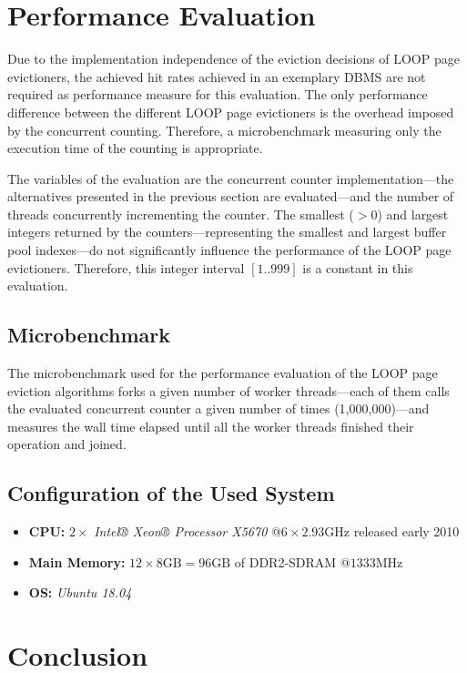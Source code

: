 \section[Performance Evaluation]{Performance Evaluation} \label{sec:loop-performance}

    Due to the implementation independence of the eviction decisions of LOOP page evictioners, the achieved hit rates achieved in an exemplary DBMS are not required as performance measure for this evaluation. The only performance difference between the different LOOP page evictioners is the overhead imposed by the concurrent counting. Therefore, a microbenchmark measuring only the execution time of the counting is appropriate.

    The variables of the evaluation are the concurrent counter implementation---the alternatives presented in the previous section are evaluated---and the number of threads concurrently incrementing the counter. The smallest ($>0$) and largest integers returned by the counters---representing the smallest and largest buffer pool indexes---do not significantly influence the performance of the LOOP page evictioners. Therefore, this integer interval $\left[1 .. 999\right]$ is a constant in this evaluation.

\subsection[Microbenchmark]{Microbenchmark}

    The microbenchmark used for the performance evaluation of the LOOP page eviction algorithms forks a given number of worker threads---each of them calls the evaluated concurrent counter a given number of times (1,000,000)---and measures the wall time elapsed until all the worker threads finished their operation and joined.

\subsection[System Configuration]{Configuration of the Used System}

\begin{@empty}
    \begin{itemize}
        \itemsep0em
        \item \textbf{CPU:} $2 \times $ \emph{Intel® Xeon® Processor X5670} @$6 \times 2.93\text{GHz}$ released early 2010
        \item \textbf{Main Memory:} $12 \times 8\text{GB} = 96\text{GB}$ of DDR2-SDRAM @$1333\text{MHz}$
        \item \textbf{OS:} \emph{Ubuntu 18.04}
    \end{itemize}
\end{@empty}

\section{Conclusion}
